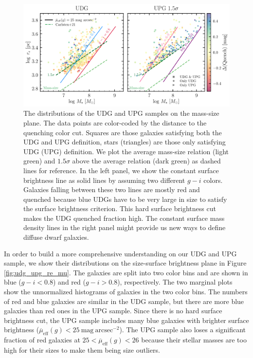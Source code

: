 \documentclass[twocolumn,astrosymb,twocolappendix]{aastex631}
\newcommand{\sbunit}{\mathrm{mag\ arcsec}^{-2}}
\newcommand{\sbeff}{\overline{\mu}_{\mathrm{eff}}(g)}
\begin{document}
\begin{CJK*}{UTF8}{gbsn}
\begin{figure}
	\vbox{ 
		\centering
		\includegraphics[width=1\linewidth]{mass_size_plane.pdf}
	}
    \caption{The distributions of the UDG and UPG samples on the mass-size plane. The data points are color-coded by the distance to the quenching color cut. Squares are those galaxies satisfying both the UDG and UPG definition, stars (triangles) are those only satisfying UDG (UPG) definition.
    We plot the average mass-size relation (light green) and $1.5\sigma$ above the average relation (dark green) as dashed lines for reference. In the left panel, we show the constant surface brightness line as solid lines by assuming two different $g-i$ colors. Galaxies falling between these two lines are mostly red and quenched because blue UDGs have to be very large in size to satisfy the surface brightness criterion. This hard surface brightness cut makes the UDG quenched fraction high. The constant surface mass density lines in the right panel might provide us new ways to define diffuse dwarf galaxies.
    }
    \label{fig:mass_size}
\end{figure}

In order to build a more comprehensive understanding on our UDG and UPG sample, we show their distributions on the size-surface brightness plane in Figure \ref{fig:udg_upg_re_mu}. The galaxies are split into two color bins and are shown in blue ($g-i < 0.8$) and red ($g-i > 0.8$), respectively. The two marginal plots show the unnormalized histograms of galaxies in the two color bins. The numbers of red and blue galaxies are similar in the UDG sample, but there are more blue galaxies than red ones in the UPG sample. Since there is no hard surface brightness cut, the UPG sample includes many blue galaxies with brighter surface brightness ($\sbeff < 25\ \sbunit$). The UPG sample also loses a significant fraction of red galaxies at $25 < \sbeff < 26$ because their stellar masses are too high for their sizes to make them being size outliers. 


\end{CJK*}
\end{document}
